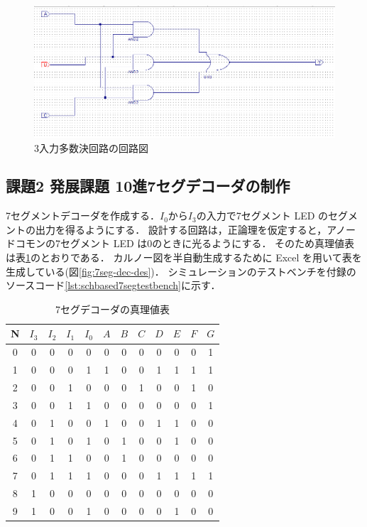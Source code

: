 \begin{figure}[tbp]
   \includegraphics[width=150mm,angle=0]{week2/pics/TMRsch.png}
   \caption{3入力多数決回路の回路図} %
   \label{fig:TMRsch} %
\end{figure}

\subsection{課題2 発展課題 10進7セグデコーダの制作}
7セグメントデコーダを作成する．$I_0$から$I_3$の入力で7セグメント LED のセグメントの出力を得るようにする．
設計する回路は，正論理を仮定すると，アノードコモンの7セグメント LED は0のときに光るようにする．
そのため真理値表は表\ref{tab:7segdec}のとおりである．
カルノー図を半自動生成するために Excel を用いて表を生成している(図\ref{fig:7seg-dec-des})．
シミュレーションのテストベンチを付録のソースコード\ref{lst:schbased7segtestbench}に示す．

\begin{table}[htb]
  \centering
  \caption{7セグデコーダの真理値表}
  \label{tab:7segdec}
  \begin{tabular}{c||cccc||ccccccc}
     N &$I_3$&$I_2$&$I_1$&$I_0$&$A$&$B$&$C$&$D$&$E$&$F$&$G$ \\ \hline
     0 & 0  &  0  &  0  &  0 & 0 & 0 & 0 & 0 & 0 & 0 & 1 \\
     1 & 0  &  0  &  0  &  1 & 1 & 0 & 0 & 1 & 1 & 1 & 1 \\
     2 & 0  &  0  &  1  &  0 & 0 & 0 & 1 & 0 & 0 & 1 & 0 \\
     3 & 0  &  0  &  1  &  1 & 0 & 0 & 0 & 0 & 0 & 0 & 1 \\
     4 & 0  &  1  &  0  &  0 & 1 & 0 & 0 & 1 & 1 & 0 & 0 \\
     5 & 0  &  1  &  0  &  1 & 0 & 1 & 0 & 0 & 1 & 0 & 0 \\
     6 & 0  &  1  &  1  &  0 & 0 & 1 & 0 & 0 & 0 & 0 & 0 \\
     7 & 0  &  1  &  1  &  1 & 0 & 0 & 0 & 1 & 1 & 1 & 1 \\
     8 & 1  &  0  &  0  &  0 & 0 & 0 & 0 & 0 & 0 & 0 & 0 \\
     9 & 1  &  0  &  0  &  1 & 0 & 0 & 0 & 0 & 1 & 0 & 0 \\
  \end{tabular}
\end{table}

